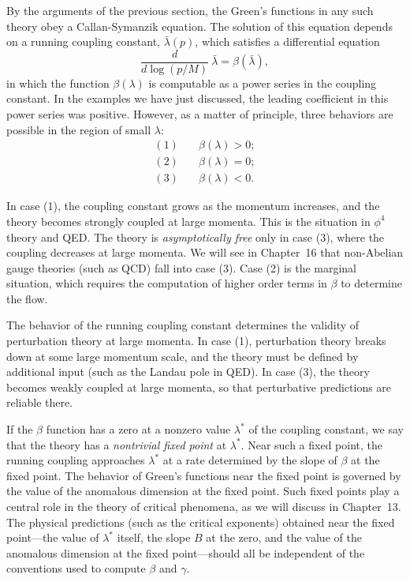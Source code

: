 By the arguments of the previous section, the Green's functions in any such
theory obey a Callan-Symanzik equation.  The solution of this equation
depends on a running coupling constant, $\bar{\lambda}(p)$, which satisfies a
differential equation
\begin{equation}
  \frac{d}{d\log(p/M)}\ \bar{\lambda} = \beta(\bar{\lambda}),
  \label{eq:12.90}
\end{equation}
in which the function $\beta(\lambda)$ is computable as a power series in the
coupling constant.  In the examples we have just discussed, the leading
coefficient in this power series was positive.  However, as a matter of
principle, three behaviors are possible in the region of small $\lambda$:
\begin{equation}
  \begin{aligned}
    (1)\quad &\beta(\lambda) > 0;\\
    (2)\quad &\beta(\lambda) = 0;\\
    (3)\quad &\beta(\lambda) < 0 .
  \end{aligned}
\end{equation}

In case (1), the coupling constant grows as the momentum increases, and the
theory becomes strongly coupled at large momenta.  This is the situation in
$\phi^4$ theory and QED.  The theory is \emph{asymptotically free} only in
case (3), where the coupling decreases at large momenta.  We will see in
Chapter~16 that non-Abelian gauge theories (such as QCD) fall into case (3).
Case (2) is the marginal situation, which requires the computation of higher
order terms in $\beta$ to determine the flow.

The behavior of the running coupling constant determines the validity of
perturbation theory at large momenta.  In case (1), perturbation theory
breaks down at some large momentum scale, and the theory must be defined by
additional input (such as the Landau pole in QED).  In case (3), the theory
becomes weakly coupled at large momenta, so that perturbative predictions are
reliable there.

If the $\beta$ function has a zero at a nonzero value $\lambda^{*}$ of the
coupling constant, we say that the theory has a \emph{nontrivial fixed point}
at $\lambda^{*}$.  Near such a fixed point, the running coupling approaches
$\lambda^{*}$ at a rate determined by the slope of $\beta$ at the fixed
point.  The behavior of Green's functions near the fixed point is governed by
the value of the anomalous dimension at the fixed point.  Such fixed points
play a central role in the theory of critical phenomena, as we will discuss
in Chapter~13.  The physical predictions (such as the critical exponents)
obtained near the fixed point---the value of $\lambda^{*}$ itself, the slope
$B$ at the zero, and the value of the anomalous dimension at the fixed
point---should all be independent of the conventions used to compute $\beta$
and $\gamma$.

